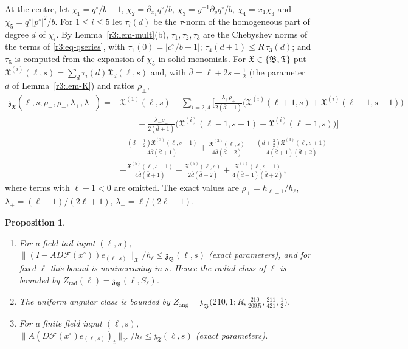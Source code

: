 \documentclass[11pt]{amsart}
\newtheorem{proposition}[theorem]{Proposition}
\theoremstyle{definition}
\theoremstyle{remark}
\numberwithin{equation}{section}
\newcommand{\Fc}{\mathcal{F}}
\newcommand{\nrm}[1]{\lVert #1\rVert}
\begin{document}
At the centre, let $\chi_1=q^\circ/b-1$, $\chi_2=\partial_{x_1}q^\circ/b$, $\chi_3=y^{-1}\partial_yq^\circ/b$, $\chi_4=x_1\chi_3$ and $\chi_5=q^\circ|p^\circ|^2/b$. For $1\leq i\leq5$ let $\tau_i(d)$ be the $\tau$-norm of the homogeneous part of degree $d$ of $\chi_i$. By Lemma~\ref{r3:lem-mult}(b), $\tau_1,\tau_2,\tau_3$ are the Chebyshev norms of the terms of \eqref{r3:eq-qseries}, with $\tau_1(0)=|c^\circ_1/b-1|$; $\tau_4(d+1)\leq R\,\tau_3(d)$; and $\tau_5$ is computed from the expansion of $\chi_5$ in solid monomials. For $\mathfrak X\in\{\mathfrak B,\mathfrak T\}$ put $\mathfrak X^{(i)}(\ell,s)=\sum_d\tau_i(d)\mathfrak X_d(\ell,s)$ and, with $\bar d=\ell+2s+\frac12$ (the parameter $d$ of Lemma~\ref{r3:lem-K}) and ratios $\rho_\pm$,
\begin{align*}
\mathfrak z_{\mathfrak X}(\ell,s;\rho_+,\rho_-,\lambda_+,\lambda_-)={}&\mathfrak X^{(1)}(\ell,s)+\sum_{i=2,4}\Big[\frac{\lambda_+\rho_+}{2(\bar d+1)}\big(\mathfrak X^{(i)}(\ell+1,s)+\mathfrak X^{(i)}(\ell+1,s-1)\big)\\
&\qquad+\frac{\lambda_-\rho_-}{2(\bar d+1)}\big(\mathfrak X^{(i)}(\ell-1,s+1)+\mathfrak X^{(i)}(\ell-1,s)\big)\Big]\\
&+\frac{(\bar d+\frac12)\mathfrak X^{(3)}(\ell,s-1)}{4\bar d(\bar d+1)}+\frac{\mathfrak X^{(3)}(\ell,s)}{4\bar d(\bar d+2)}+\frac{(\bar d+\frac32)\mathfrak X^{(3)}(\ell,s+1)}{4(\bar d+1)(\bar d+2)}\\
&+\frac{\mathfrak X^{(5)}(\ell,s-1)}{4\bar d(\bar d+1)}+\frac{\mathfrak X^{(5)}(\ell,s)}{2\bar d(\bar d+2)}+\frac{\mathfrak X^{(5)}(\ell,s+1)}{4(\bar d+1)(\bar d+2)} ,
\end{align*}
where terms with $\ell-1<0$ are omitted. The exact values are $\rho_\pm=h_{\ell\pm1}/h_\ell$, $\lambda_+=(\ell+1)/(2\ell+1)$, $\lambda_-=\ell/(2\ell+1)$.

\begin{proposition}\label{r3:prop-gtail}
\begin{enumerate}[label=\textup{(\alph*)}]
\item For a field tail input $(\ell,s)$, $\nrm{(I-AD\Fc(x^\circ))e_{(\ell,s)}}_{\mathcal X}/h_\ell\leq\mathfrak z_{\mathfrak B}(\ell,s)$ (exact parameters), and for fixed $\ell$ this bound is nonincreasing in $s$. Hence the radial class of $\ell$ is bounded by $Z_{\mathrm{rad}}(\ell)=\mathfrak z_{\mathfrak B}(\ell,S_\ell)$.
\item The uniform angular class is bounded by $Z_{\mathrm{ang}}=\mathfrak z_{\mathfrak B}\big(210,1;R,\frac{210}{209R},\frac{211}{421},\frac12\big)$.
\item For a finite field input $(\ell,s)$, $\nrm{A(D\Fc(x^\circ)e_{(\ell,s)})_t}_{\mathcal X}/h_\ell\leq\mathfrak z_{\mathfrak T}(\ell,s)$ (exact parameters).
\end{enumerate}
\end{proposition}
\end{document}
